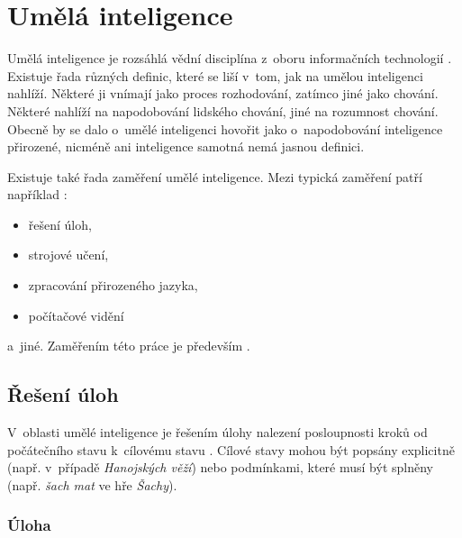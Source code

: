 \chapter{Umělá inteligence}
\label{ch:umela-inteligence}

Umělá inteligence je rozsáhlá vědní disciplína z~oboru informačních technologií \cite{AI_Russel_Norvig}. Existuje řada různých definic, které se liší v~tom, jak na umělou inteligenci nahlíží. Některé ji vnímají jako proces rozhodování, zatímco jiné jako chování. Některé nahlíží na napodobování lidského chování, jiné na rozumnost chování. Obecně by se dalo o~umělé inteligenci hovořit jako o~napodobování inteligence přirozené, nicméně ani inteligence samotná nemá jasnou definici.

Existuje také řada zaměření umělé inteligence. Mezi typická zaměření patří například \cite{AI_Russel_Norvig}:
\begin{itemize}
    \item řešení úloh,
    \item strojové učení,
    \item zpracování přirozeného jazyka,
    \item počítačové vidění
\end{itemize}
a~jiné. Zaměřením této práce je především .


\section{Řešení úloh}
\label{sec:reseni-uloh}

V~oblasti umělé inteligence je řešením úlohy nalezení posloupnosti kroků od počátečního stavu k~cílovému stavu \cite{AI_Russel_Norvig}. Cílové stavy mohou být popsány explicitně (např. v~případě \emph{Hanojských věží}) nebo podmínkami, které musí být splněny (např. \emph{šach mat} ve hře \emph{Šachy}).

\subsection*{Úloha}


